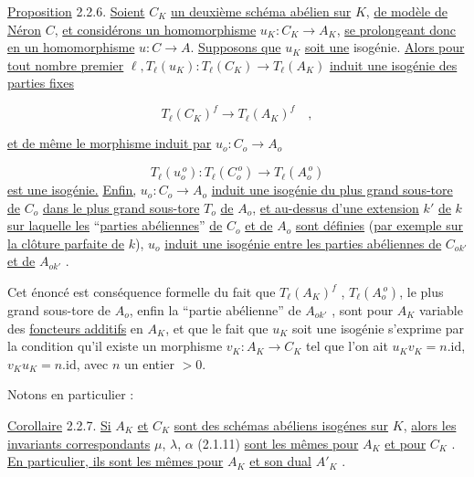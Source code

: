 \underline{Proposition} 2.2.6. \underline{Soient} $C_{K}$ \underline{un deuxième schéma abélien sur} $K$, \underline{de modèle de Néron} $C$, \underline{et considérons un homomorphisme} $u_{K}:C_{K} \longrightarrow A_{K}$, \underline{se prolongeant donc en un homomorphisme} $u: C \longrightarrow A$. \underline{Supposons que} $u_{K}$ \underline{soit une} isogénie. \underline{Alors pour tout nombre premier} $\ell,T_{\ell}(u_{K}):T_{\ell}(C_{K}) \longrightarrow T_{\ell}(A_{K})$ \underline{induit une isogénie des parties fixes}

\begin{equation}\tag{2.2.6.1}
T_{\ell}(C_{K})^{f} \longrightarrow T_{\ell}(A_{K})^{f} \quad ,
\end{equation}



\underline{et de même le morphisme induit par} $u_{o} : C_{o} \longrightarrow A_{o}$

\begin{equation}\tag{2.2.6.2}
T_{\ell}(u_{o}^{\,o}) : T_{\ell}(C_{o}^{\,o}) \longrightarrow T_{\ell}(A_{o}^{\,o})
\end{equation}
\underline{est une isogénie.} \underline{Enfin,} $u_{o} : C_{o} \longrightarrow A_{o}$ \underline{induit une isogénie du plus grand sous-tore de} $C_{o}$ \underline{dans le plus grand sous-tore} $T_{o}$ \underline{de} $A_{o}$, \underline{et au-dessus d'une extension} $k'$ \underline{de} $k$ \underline{sur laquelle les} ``\underline{parties abéliennes}'' \underline{de} $C_{o}$ \underline{et de} $A_{o}$ \underline{sont définies} (\underline{par exemple sur la clôture parfaite de} $k$), $u_{o}$ \underline{induit une isogénie entre les parties abéliennes de} $C_{ok'}$ \underline{et de} $A_{ok'}$ .

Cet énoncé est conséquence formelle du fait que $T_{\ell}(A_{K})^{f}$ , $T_{\ell}(A_{o}^{\,o})$, le plus grand sous-tore de $A_{o}$, enfin la ``partie abélienne'' de $A_{ok'}$ , sont pour $A_{K}$ variable des \underline{foncteurs additifs} en $A_{K}$, et que le fait que $u_{K}$ soit une isogénie s'exprime par la condition qu'il existe un morphisme $v_{K}:A_{K} \longrightarrow C_{K}$ tel que l'on ait $u_{K}v_{K} = n.\mathrm{id}$, $v_{K}u_{K} = n.\mathrm{id}$, avec $n$ un entier $> 0$.

Notons en particulier :

\underline{Corollaire} 2.2.7. \underline{Si} $A_{K}$ \underline{et} $C_{K}$ \underline{sont des schémas abéliens isogénes sur} $K$, \underline{alors les invariants correspondants} $\mu$, $\lambda$, $\alpha$ (2.1.11) \underline{sont les mêmes pour} $A_{K}$ \underline{et pour} $C_{K}$ . \underline{En particulier, ils sont les mêmes pour} $A_{K}$ \underline{et son dual} $A'_{K}$ .

